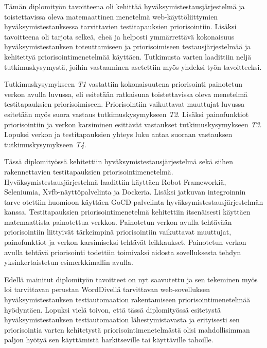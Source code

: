 Tämän diplomityön tavoitteena oli kehittää hyväksymistestausjärjestelmä ja toistettavissa oleva matemaattinen menetelmä web-käyttöliittymien hyväksymistestauksessa tarvittavien testitapauksien priorisointiin.
Lisäksi tavoitteena oli tarjota selkeä, eheä ja helposti ymmärrettävä kokonaisuus hyväksymistestauksen toteuttamiseen ja priorisoimiseen testausjärjestelmää ja kehitettyä priorisointimenetelmää käyttäen.
Tutkimusta varten laadittiin neljä tutkimuskysymystä, joihin vastaaminen asetettiin myös yhdeksi työn tavoitteeksi.

Tutkimuskysymykseen \emph{T1} vastattiin kokonaisuutena priorisointi painotetun verkon avulla luvussa, eli esitetään ratkaisuna toistettavissa oleva menetelmä testitapauksien priorisoimiseen.
Priorisointiin vaikuttavat muuttujat luvussa esitetään myös suora vastaus tutkimuskysymykseen \emph{T2}.
Lisäksi painofunktiot priorisointiin ja verkon karsiminen esittävät vastaukset tutkimuskysymykseen \emph{T3}.
Lopuksi verkon ja testitapauksien yhteys luku antaa suoraan vastauksen tutkimuskysymykseen \emph{T4}.

Tässä diplomityössä kehitettiin hyväksymistestausjärjestelmä sekä siihen rakennettavien testitapauksien priorisointimenetelmä.
Hyväksymistestausjärjestelmä laadittiin käyttäen Robot Frameworkiä, Seleniumia, Xvfb-näyttöpalvelinta ja Dockeria.
Lisäksi jatkuvan integroinnin tarve otettiin huomioon käyttäen GoCD-palvelinta hyväksymistestausjärjestelmän kanssa.
Testitapauksien priorisointimenetelmä kehitettiin itsenäisesti käyttäen matemaattista painotettua verkkoa.
Painotetun verkon avulla tehtävään priorisointiin liittyivät tärkeimpinä priorisointiin vaikuttavat muuttujat, painofunktiot ja verkon karsimiseksi tehtävät leikkaukset.
Painotetun verkon avulla tehtävä priorisointi todettiin toimivaksi aidosta sovelluksesta tehdyn yksinkertaistetun esimerkkimallin avulla.

Edellä mainitut diplomityön tavoitteet on nyt saavutettu ja sen tekeminen myös loi tarvittavan perustan WordDivellä tarvittavan web-sovelluksen hyväksymistestauksen testiautomaation rakentamiseen priorisointimenetelmää hyödyntäen.
Lopuksi vielä toivon, että tässä diplomityössä esitetystä hyväksymistestauksen testiautomaation lähestymistavasta ja erityisesti sen priorisointia varten kehitetystä priorisointimenetelmästä olisi mahdollisimman paljon hyötyä sen käyttämistä harkitseville tai käyttäville tahoille.